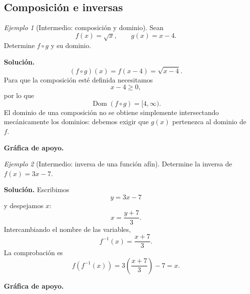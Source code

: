 \documentclass[12pt]{article}
\theoremstyle{remark}
\newtheorem{ejemplo}{Ejemplo}[section]
\newcommand{\Dom}{\operatorname{Dom}}
\begin{document}
\subsection*{Composición e inversas}

\begin{ejemplo}[Intermedio: composición y dominio]
Sean
\[
f(x)=\sqrt{x},\qquad g(x)=x-4.
\]
Determine $f\circ g$ y su dominio.

\textbf{Solución.}
\[
(f\circ g)(x)=f(x-4)=\sqrt{x-4}.
\]
Para que la composición esté definida necesitamos
\[
x-4\ge0,
\]
por lo que
\[
\boxed{\Dom(f\circ g)=[4,\infty)}.
\]
El dominio de una composición no se obtiene simplemente intersectando mecánicamente los dominios: debemos exigir que $g(x)$ pertenezca al dominio de $f$.


\textbf{Gráfica de apoyo.}\medskip
\begin{center}
\end{center}

\end{ejemplo}

\begin{ejemplo}[Intermedio: inversa de una función afín]
Determine la inversa de $f(x)=3x-7$.

\textbf{Solución.} Escribimos
\[
y=3x-7
\]
y despejamos $x$:
\[
x=\frac{y+7}{3}.
\]
Intercambiando el nombre de las variables,
\[
\boxed{f^{-1}(x)=\frac{x+7}{3}}.
\]
La comprobación es
\[
f(f^{-1}(x))=3\left(\frac{x+7}{3}\right)-7=x.
\]


\textbf{Gráfica de apoyo.}\medskip
\begin{center}
\end{center}

\end{ejemplo}
\end{document}
